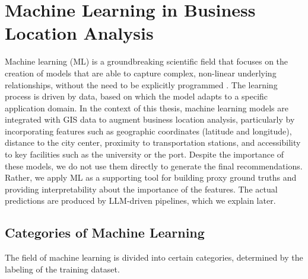 \section{Machine Learning in Business Location Analysis}

Machine learning (ML) is a groundbreaking scientific field that focuses on the creation of models that are able to capture complex, non-linear underlying relationships, without the need to be explicitly programmed \cite{murphy2012ml}. The learning process is driven by data, based on which the model adapts to a specific application domain. In the context of this thesis, machine learning models are integrated with GIS data to augment business location analysis, particularly by incorporating features such as geographic coordinates (latitude and longitude), distance to the city center, proximity to transportation stations, and accessibility to key facilities such as the university or the port. Despite the importance of these models, we do not use them directly to generate the final recommendations. Rather, we apply ML as a supporting tool for building proxy ground truths and providing interpretability about the importance of the features. The actual predictions are produced by LLM-driven pipelines, which we explain later.


\subsection{Categories of Machine Learning}
The field of machine learning is divided into certain categories, determined by the labeling of the training dataset. 


